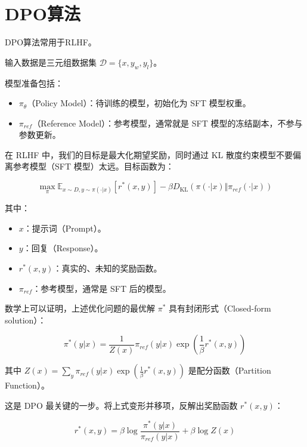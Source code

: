 \setcounter{section}{1}

\hypertarget{dpoux7b97ux6cd5}{%
\section{DPO算法}\label{dpoux7b97ux6cd5}}

DPO算法常用于RLHF。

输入数据是三元组数据集 \(\mathcal{D}=\{x,y_w,y_l\}\)。

模型准备包括：

\begin{itemize}
\tightlist
\item
  \(\pi_\theta\)（Policy Model）：待训练的模型，初始化为 SFT 模型权重。
\item
  \(\pi_{ref}\)（Reference Model）：参考模型，通常就是 SFT 模型的冻结副本，不参与参数更新。
\end{itemize}

在 RLHF 中，我们的目标是最大化期望奖励，同时通过 KL 散度约束模型不要偏离参考模型（SFT 模型）太远。目标函数为：

\[
\max_{\pi}\mathbb{E}_{x\sim D,y\sim\pi(\cdot|x)}[r^*(x,y)]-\beta D_{\mathrm{KL}}(\pi(\cdot|x)\Vert\pi_{ref}(\cdot|x))
\]

其中：

\begin{itemize}
\tightlist
\item
  \(x\)：提示词（Prompt）。
\item
  \(y\)：回复（Response）。
\item
  \(r^*(x,y)\)：真实的、未知的奖励函数。
\item
  \(\pi_{ref}\)：参考模型，通常是 SFT 后的模型。
\end{itemize}

数学上可以证明，上述优化问题的最优解 \(\pi^*\) 具有封闭形式（Closed-form solution）：

\[
\pi^*(y|x)=\frac{1}{Z(x)}\pi_{ref}(y|x)\exp\left(\frac{1}{\beta}r^*(x,y)\right)
\]

其中 \(Z(x)=\sum_y\pi_{ref}(y|x)\exp\left(\frac{1}{\beta}r^*(x,y)\right)\) 是配分函数（Partition Function）。

这是 DPO 最关键的一步。将上式变形并移项，反解出奖励函数 \(r^*(x,y)\)：

\[
r^*(x,y)=\beta\log\frac{\pi^*(y|x)}{\pi_{ref}(y|x)}+\beta\log Z(x)
\]


